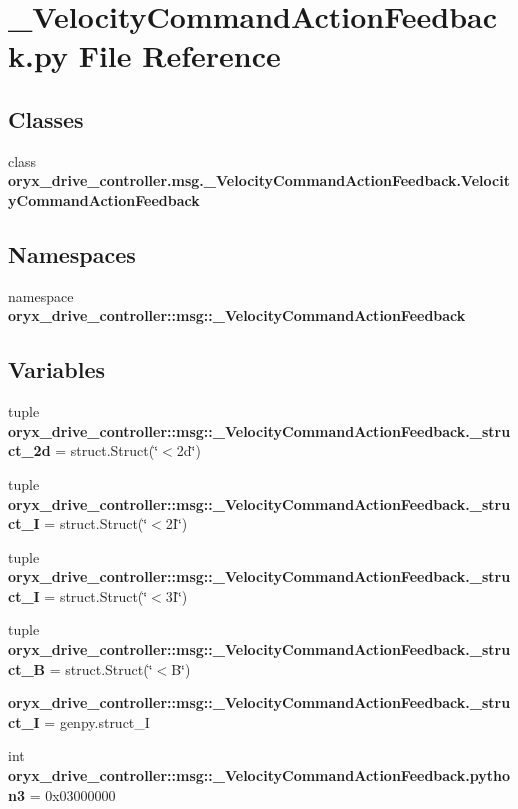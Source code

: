 \section{\-\_\-\-Velocity\-Command\-Action\-Feedback.\-py \-File \-Reference}
\label{__VelocityCommandActionFeedback_8py}
\subsection*{\-Classes}
\begin{DoxyCompactItemize}
\item 
class {\bf oryx\-\_\-drive\-\_\-controller.\-msg.\-\_\-\-Velocity\-Command\-Action\-Feedback.\-Velocity\-Command\-Action\-Feedback}
\end{DoxyCompactItemize}
\subsection*{\-Namespaces}
\begin{DoxyCompactItemize}
\item 
namespace {\bf oryx\-\_\-drive\-\_\-controller\-::msg\-::\-\_\-\-Velocity\-Command\-Action\-Feedback}
\end{DoxyCompactItemize}
\subsection*{\-Variables}
\begin{DoxyCompactItemize}
\item 
tuple {\bf oryx\-\_\-drive\-\_\-controller\-::msg\-::\-\_\-\-Velocity\-Command\-Action\-Feedback.\-\_\-struct\-\_\-2d} = struct.\-Struct(\char`\"{}$<$2d\char`\"{})
\item 
tuple {\bf oryx\-\_\-drive\-\_\-controller\-::msg\-::\-\_\-\-Velocity\-Command\-Action\-Feedback.\-\_\-struct\-\_\-I} = struct.\-Struct(\char`\"{}$<$2\-I\char`\"{})
\item 
tuple {\bf oryx\-\_\-drive\-\_\-controller\-::msg\-::\-\_\-\-Velocity\-Command\-Action\-Feedback.\-\_\-struct\-\_\-I} = struct.\-Struct(\char`\"{}$<$3\-I\char`\"{})
\item 
tuple {\bf oryx\-\_\-drive\-\_\-controller\-::msg\-::\-\_\-\-Velocity\-Command\-Action\-Feedback.\-\_\-struct\-\_\-\-B} = struct.\-Struct(\char`\"{}$<$\-B\char`\"{})
\item 
{\bf oryx\-\_\-drive\-\_\-controller\-::msg\-::\-\_\-\-Velocity\-Command\-Action\-Feedback.\-\_\-struct\-\_\-\-I} = genpy.\-struct\-\_\-\-I
\item 
int {\bf oryx\-\_\-drive\-\_\-controller\-::msg\-::\-\_\-\-Velocity\-Command\-Action\-Feedback.\-python3} = 0x03000000
\end{DoxyCompactItemize}
